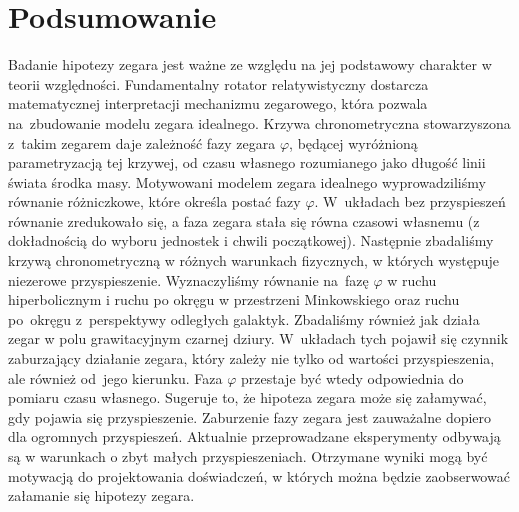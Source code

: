 \section{Podsumowanie}
Badanie hipotezy zegara jest ważne ze względu na jej 
podstawowy charakter w teorii względności. 
Fundamentalny rotator relatywistyczny dostarcza matematycznej 
interpretacji mechanizmu zegarowego, która pozwala na~zbudowanie 
modelu zegara idealnego. Krzywa chronometryczna stowarzyszona z~takim 
zegarem daje zależność fazy zegara $\varphi$, będącej 
wyróżnioną parametryzacją tej krzywej, od czasu własnego
rozumianego jako długość linii świata środka masy.
Motywowani modelem zegara idealnego wyprowadziliśmy równanie różniczkowe, 
które określa postać fazy $\varphi$. W~układach 
bez przyspieszeń równanie zredukowało się, a faza zegara stała się 
równa czasowi własnemu (z dokładnością do wyboru jednostek i 
chwili początkowej).
Następnie zbadaliśmy krzywą chronometryczną w różnych warunkach fizycznych,
w których występuje niezerowe przyspieszenie. Wyznaczyliśmy równanie na~fazę 
$\varphi$ w ruchu hiperbolicznym i 
ruchu po okręgu 
w przestrzeni Minkowskiego oraz
ruchu po~okręgu z~perspektywy odległych galaktyk. Zbadaliśmy
 również jak działa zegar w polu grawitacyjnym czarnej dziury.
W~układach tych pojawił się czynnik zaburzający działanie zegara,
który zależy nie tylko od wartości przyspieszenia, ale również 
od~jego kierunku.
Faza $\varphi$ przestaje być wtedy odpowiednia do pomiaru 
 czasu własnego. Sugeruje to, że hipoteza zegara może 
się załamywać, gdy pojawia się przyspieszenie. 
Zaburzenie fazy zegara jest zauważalne dopiero dla
 ogromnych przyspieszeń.
Aktualnie przeprowadzane eksperymenty odbywają są w warunkach o zbyt małych 
przyspieszeniach. Otrzymane wyniki mogą być motywacją do projektowania 
doświadczeń, w których można będzie zaobserwować 
załamanie się hipotezy zegara.
